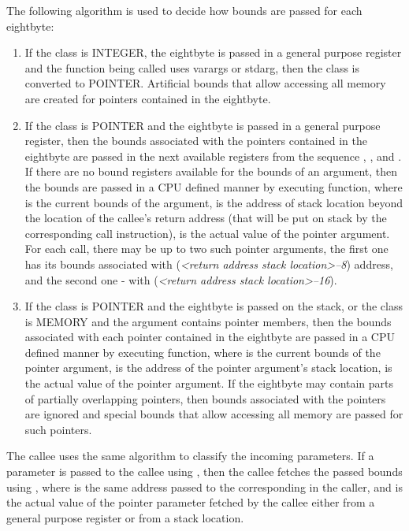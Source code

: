 The following algorithm is used to decide how bounds are passed for each
eightbyte:
\begin{enumerate}
\item If the class is INTEGER, the eightbyte is passed in a general
  purpose register and the function being called uses varargs or stdarg,
  then the class is converted to POINTER.  Artificial bounds that allow
  accessing all memory are created for pointers contained in the eightbyte.
\item If the class is POINTER and the eightbyte is passed in a general
  purpose register, then the bounds associated with the pointers contained
  in the eightbyte are passed in the next available registers from the sequence
  , ,  and .  If there are no bound registers available
  for the bounds of an argument, then the bounds are passed in a CPU defined manner
  by executing  function, where  is
  the current bounds of the argument,  is the address of stack location beyond
  the location of the callee's return address (that will be put on stack by the corresponding
  call instruction),  is the actual value of the pointer argument.
  For each call, there may be up to two such pointer arguments,
  the first one has its bounds associated with (\emph{<return address stack location>--8})
  address, and the second one - with (\emph{<return address stack location>--16}).
\item If the class is POINTER and the eightbyte is passed on the stack, or
  the class is MEMORY and the argument contains pointer members,
  then the bounds associated with each pointer contained in the eightbyte
  are passed in a CPU defined manner by executing  function,
  where  is the current bounds of the pointer argument,  is the address
  of the pointer argument's stack location,  is the actual value of the pointer argument.
  If the eightbyte may contain parts of partially overlapping
  pointers, then bounds associated with the pointers are ignored and special
  bounds that allow accessing all memory are passed for such pointers.
\end{enumerate}
The callee uses the same algorithm to classify the incoming parameters.
If a parameter is passed to the callee using , then
the callee fetches the passed bounds using ,
where  is the same address passed to the corresponding 
in the caller, and  is the actual value of the pointer parameter fetched
by the callee either from a general purpose register or from a stack location.


